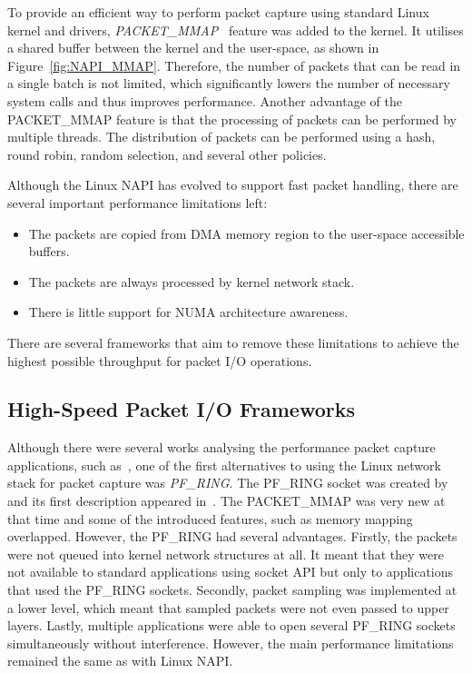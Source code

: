 To provide an efficient way to perform packet capture using standard Linux kernel and drivers, \emph{PACKET\_MMAP}~\cite{LinuxKernelOrganization-2017-PACKETMMAP} feature was added to the kernel. It utilises a shared buffer between the kernel and the user-space, as shown in Figure~\ref{fig:NAPI_MMAP}. Therefore, the number of packets that can be read in a single batch is not limited, which significantly lowers the number of necessary system calls and thus improves performance. Another advantage of the PACKET\_MMAP feature is that the processing of packets can be performed by multiple threads. The distribution of packets can be performed using a hash, round robin, random selection, and several other policies. 

Although the Linux NAPI has evolved to support fast packet handling, there are several important performance limitations left:
\begin{itemize}
  \item The packets are copied from DMA memory region to the user-space accessible buffers.
  \item The packets are always processed by kernel network stack.
  \item There is little support for NUMA architecture awareness.
\end{itemize}

There are several frameworks that aim to remove these limitations to achieve the highest possible throughput for packet I/O operations.


\subsection{High-Speed Packet I/O Frameworks}

Although there were several works analysing the performance packet capture applications, such as~\cite{Degioanni-2003-Profiling}, one of the first alternatives to using the Linux network stack for packet capture was \emph{PF\_RING}. The PF\_RING socket was created by \citeauthor{Deri-2004-Improving} and its first description appeared in~\cite{Deri-2004-Improving}. The PACKET\_MMAP was very new at that time and some of the introduced features, such as memory mapping overlapped. However, the PF\_RING had several advantages. Firstly, the packets were not queued into kernel network structures at all. It meant that they were not available to standard applications using socket API but only to applications that used the PF\_RING sockets. Secondly, packet sampling was implemented at a lower level, which meant that sampled packets were not even passed to upper layers. Lastly, multiple applications were able to open several PF\_RING sockets simultaneously without interference. However, the main performance limitations remained the same as with Linux NAPI.

